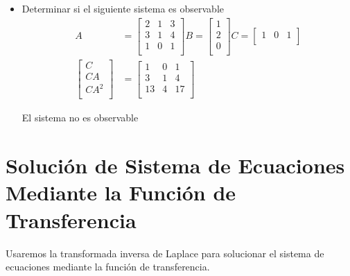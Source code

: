 \documentclass[12pt]{article}
\begin{document}
\begin{itemize}
    \item Determinar si el siguiente sistema es observable
    \begin{equation}
        \begin{split}
            A&=
            \begin{bmatrix}
                2 & 1 & 3 \\
                3 & 1 & 4 \\
                1 & 0 & 1 \\
            \end{bmatrix}
            B=
            \begin{bmatrix}
                1 \\
                2 \\
                0 \\
            \end{bmatrix}
            C=
            \begin{bmatrix}
                1 & 0 & 1\\
            \end{bmatrix}\\
            \begin{bmatrix}
                C \\
                CA \\
                CA^2 \\
            \end{bmatrix}&=
            \begin{bmatrix}
                1 & 0 & 1 \\
                3 & 1 & 4 \\
                13 & 4 & 17 \\
            \end{bmatrix}
        \end{split}
        \label{eq:controla1}
    \end{equation}

    El sistema no es observable
\end{itemize}

\section{Solución de Sistema de Ecuaciones Mediante la Función de Transferencia}
Usaremos la transformada inversa de Laplace para solucionar el sistema de ecuaciones mediante la función de transferencia.
\end{document}
